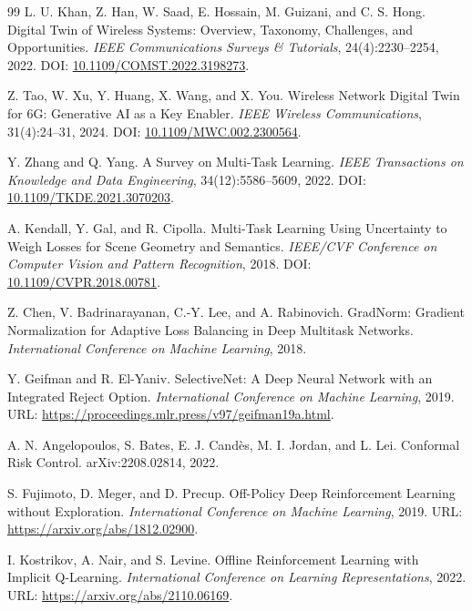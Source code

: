 \documentclass[letterpaper,journal]{IEEEtran}
\begin{document}
\begin{thebibliography}{99}
L. U. Khan, Z. Han, W. Saad, E. Hossain, M. Guizani, and C. S. Hong.
\newblock Digital Twin of Wireless Systems: Overview, Taxonomy, Challenges, and Opportunities.
\newblock \textit{IEEE Communications Surveys \& Tutorials}, 24(4):2230--2254, 2022.
\newblock DOI: \href{https://doi.org/10.1109/COMST.2022.3198273}{10.1109/COMST.2022.3198273}.

Z. Tao, W. Xu, Y. Huang, X. Wang, and X. You.
\newblock Wireless Network Digital Twin for 6G: Generative AI as a Key Enabler.
\newblock \textit{IEEE Wireless Communications}, 31(4):24--31, 2024.
\newblock DOI: \href{https://doi.org/10.1109/MWC.002.2300564}{10.1109/MWC.002.2300564}.

Y. Zhang and Q. Yang.
\newblock A Survey on Multi-Task Learning.
\newblock \textit{IEEE Transactions on Knowledge and Data Engineering}, 34(12):5586--5609, 2022.
\newblock DOI: \href{https://doi.org/10.1109/TKDE.2021.3070203}{10.1109/TKDE.2021.3070203}.

A. Kendall, Y. Gal, and R. Cipolla.
\newblock Multi-Task Learning Using Uncertainty to Weigh Losses for Scene Geometry and Semantics.
\newblock \textit{IEEE/CVF Conference on Computer Vision and Pattern Recognition}, 2018.
\newblock DOI: \href{https://doi.org/10.1109/CVPR.2018.00781}{10.1109/CVPR.2018.00781}.

Z. Chen, V. Badrinarayanan, C.-Y. Lee, and A. Rabinovich.
\newblock GradNorm: Gradient Normalization for Adaptive Loss Balancing in Deep Multitask Networks.
\newblock \textit{International Conference on Machine Learning}, 2018.

Y. Geifman and R. El-Yaniv.
\newblock SelectiveNet: A Deep Neural Network with an Integrated Reject Option.
\newblock \textit{International Conference on Machine Learning}, 2019.
\newblock URL: \url{https://proceedings.mlr.press/v97/geifman19a.html}.

A. N. Angelopoulos, S. Bates, E. J. Cand\`es, M. I. Jordan, and L. Lei.
\newblock Conformal Risk Control.
\newblock arXiv:2208.02814, 2022.

S. Fujimoto, D. Meger, and D. Precup.
\newblock Off-Policy Deep Reinforcement Learning without Exploration.
\newblock \textit{International Conference on Machine Learning}, 2019.
\newblock URL: \url{https://arxiv.org/abs/1812.02900}.

I. Kostrikov, A. Nair, and S. Levine.
\newblock Offline Reinforcement Learning with Implicit Q-Learning.
\newblock \textit{International Conference on Learning Representations}, 2022.
\newblock URL: \url{https://arxiv.org/abs/2110.06169}.


\end{thebibliography}
\end{document}

